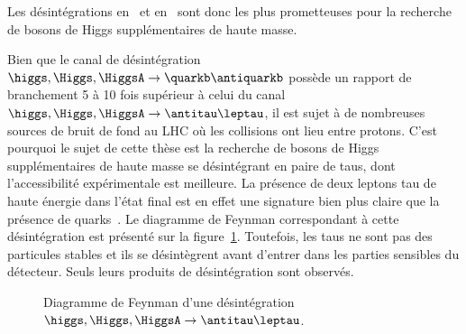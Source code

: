 Les désintégrations en \quarkb\antiquarkb\ et en \antitau\leptau\ sont donc les plus prometteuses pour la recherche de bosons de Higgs supplémentaires de haute masse.
\par Bien que le canal de désintégration $\higgs,\Higgs,\HiggsA \to \quarkb\antiquarkb$ possède un rapport de branchement 5 à 10 fois supérieur à celui du canal $\higgs,\Higgs,\HiggsA \to \antitau\leptau$, il est sujet à de nombreuses sources de bruit de fond au LHC où les collisions ont lieu entre protons.
C'est pourquoi le sujet de cette thèse est la recherche de bosons de Higgs supplémentaires de haute masse se désintégrant en paire de taus, dont l'accessibilité expérimentale est meilleure.
La présence de deux leptons tau de haute énergie dans l'état final est en effet une signature bien plus claire que la présence de quarks~\quarkb.
Le diagramme de Feynman correspondant à cette désintégration est présenté sur la figure~\ref{fig-H_to_tau_tau_fmf_graph_1}.
Toutefois, les taus ne sont pas des particules stables et ils se désintègrent avant d'entrer dans les parties sensibles du détecteur.
Seuls leurs produits de désintégration sont observés.
\begin{figure}[h]
\centering

\vspace{\baselineskip}
\caption[Désintégration $\higgs, \Higgs, \HiggsA \to \antitau\leptau$.]{Diagramme de Feynman d'une désintégration $\higgs, \Higgs, \HiggsA \to \antitau\leptau$.}
\label{fig-H_to_tau_tau_fmf_graph_1}
\end{figure}
